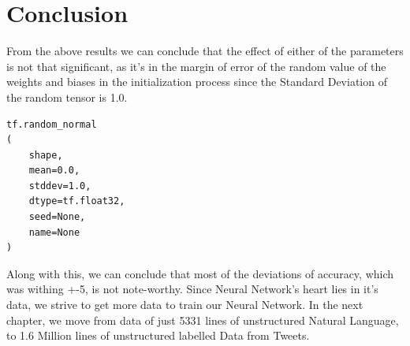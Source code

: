 \section{Conclusion}
From the above results we can conclude that the effect of either of the parameters is not that significant, as it's in the margin of error of the random value of the weights and biases in the initialization process since the Standard Deviation of the random tensor is 1.0. 

\begin{verbatim}
tf.random_normal
(
    shape,
    mean=0.0,
    stddev=1.0,
    dtype=tf.float32,
    seed=None,
    name=None
)
\end{verbatim}

Along with this, we can conclude that most of the deviations of accuracy, which was withing +-5, is not note-worthy.\newline
Since Neural Network's heart lies in it's data, we strive to get more data to train our Neural Network. In the next chapter, we move from data  of just 5331 lines of unstructured Natural Language, to 1.6 Million lines of unstructured labelled Data from Tweets.

